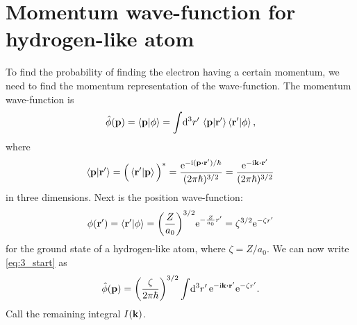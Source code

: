 \documentclass[11pt,letter, swedish, english
]{article}
\begin{document}
\section{Momentum wave-function for hydrogen-like atom}
\newcommand{\vp}{\vb{p}}
\newcommand{\vk}{\vb{k}}
\newcommand{\Za}{\frac{Z}{a_0}}
To find the probability of finding the electron having a certain
momentum, we need to find the momentum representation of the
wave-function. The momentum wave-function is
\begin{equation}\label{eq:3_start}
\hat{\phi}(\vp)=\ip{\vp}{\phi}
=\int\!\rd^3r'\, \ip{\vp}{\vb{r}'}\ip{\vb{r}'}{\phi},
\end{equation}
where
\begin{equation}
\ip{\vp}{\vb{r}'}=\Big(\ip{\vb{r}'}{\vp}\Big)^*
=\frac{\ee^{-\ii(\vp\vdot\vb{r}')/\hbar}}{(2\pi\hbar)^{3/2}}
=\frac{\ee^{-\ii\vk\vdot\vb{r}'}}{(2\pi\hbar)^{3/2}}
\end{equation}
in three dimensions. Next is the position wave-function:
\begin{equation}
\phi(\vb{r}')=\ip{\vb{r}'}{\phi}=\qty(\Za)^{3/2}\ee^{-\Za r'}
=\zeta^{3/2}\ee^{-\zeta r'}
\end{equation}
for the ground state of a hydrogen-like atom, where $\zeta=Z/a_0$.
We can now write \eqref{eq:3_start} as
\begin{equation}
\hat{\phi}(\vp)=\qty(\frac{\zeta}{2\pi\hbar})^{3/2}
\int\!\rd^3r'\,
\ee^{-\ii\vk\vdot\vb{r}'}
\ee^{-\zeta r'}.
\end{equation}
Call the remaining integral $I(\vk)$.
\end{document}

